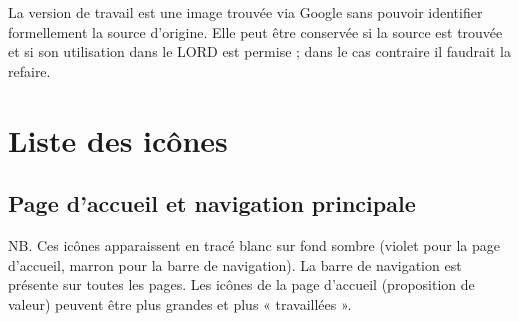 \documentclass[a4paper,10pt]{article}
\begin{document}
La version de travail est une image trouvée via Google sans pouvoir identifier formellement la source d'origine. Elle peut être conservée si la source est trouvée et si son utilisation dans le LORD est permise ; dans le cas contraire il faudrait la refaire.

\section{Liste des icônes}
\subsection{Page d'accueil et navigation principale}

NB. Ces icônes apparaissent en tracé blanc sur fond sombre (violet pour la page d'accueil, marron pour la barre de navigation). La barre de navigation est présente sur toutes les pages. Les icônes de la page d'accueil (proposition de valeur) peuvent être plus grandes et plus « travaillées ».   
\end{document}
